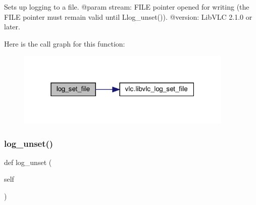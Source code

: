 \begin{DoxyVerb}Sets up logging to a file.
@param stream: FILE pointer opened for writing (the FILE pointer must remain valid until L{log_unset}()).
@version: LibVLC 2.1.0 or later.
\end{DoxyVerb}
 Here is the call graph for this function\+:
\nopagebreak
\begin{figure}[H]
\begin{center}
\leavevmode
\includegraphics[width=292pt]{classvlc_1_1_instance_a44432718b2b47222fcf097605de1bfad_cgraph}
\end{center}
\end{figure}
\mbox{\label{classvlc_1_1_instance_a7785fcbfc657f19465b52c9130d8df63}} 
\subsubsection{\texorpdfstring{log\+\_\+unset()}{log\_unset()}}
{\footnotesize\ttfamily def log\+\_\+unset (\begin{DoxyParamCaption}\item[{}]{self }\end{DoxyParamCaption})}

